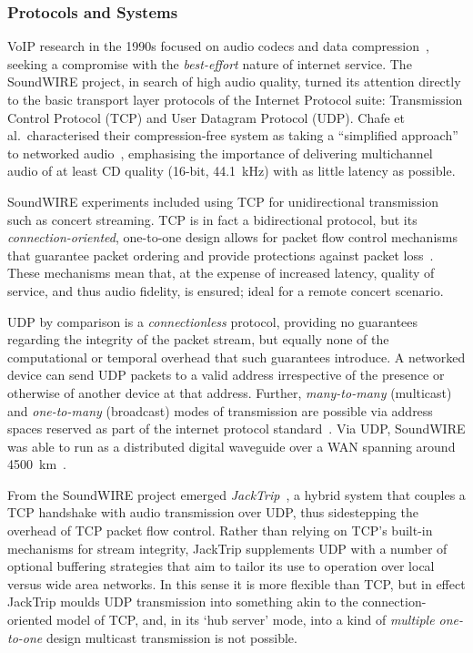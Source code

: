 \subsubsection{Protocols and Systems}\label{subsubsec:protocols-systems}

VoIP research in the 1990s focused on audio codecs and data
compression~\citep{turletti_inria_1995,hardman_successful_1998}, seeking a
compromise with the \textit{best-effort} nature of internet service.
The SoundWIRE project, in search of high audio quality, turned its attention
directly to the basic transport layer protocols of the Internet Protocol suite:
Transmission Control Protocol (TCP) and User Datagram Protocol (UDP).
Chafe et al.\ characterised their compression-free system as taking a
``simplified approach'' to networked audio~\citep{chafe_simplified_2000},
emphasising the importance of delivering multichannel audio of at least CD
quality (16-bit, \qty{44.1}{\kHz}) with as little latency as possible.

SoundWIRE experiments included using TCP for unidirectional transmission such as
concert streaming.
TCP is in fact a bidirectional protocol, but its \textit{connection-oriented},
one-to-one design allows for packet flow control mechanisms that guarantee
packet ordering and provide protections against packet
loss~\citep{schiavoni_alternatives_2013,al-dhief_performance_2018}.
These mechanisms mean that, at the expense of increased latency, quality of
service, and thus audio fidelity, is ensured; ideal for a remote concert
scenario.

UDP by comparison is a \textit{connectionless} protocol, providing no guarantees
regarding the integrity of the packet stream, but equally none of the
computational or temporal overhead that such guarantees introduce.
A networked device can send UDP packets to a valid address irrespective of the
presence or otherwise of another device at that address.
Further, \textit{many-to-many} (multicast) and \textit{one-to-many} (broadcast)
modes of transmission are possible via address spaces reserved as part of the
internet protocol standard~\citep{meyer_iana_2010}.
Via UDP, SoundWIRE was able to run as a distributed digital waveguide over a
WAN spanning around \qty{4500}{\km}~\citep{chafe_simplified_2000}.

From the SoundWIRE project emerged
\textit{JackTrip}~\citep{caceres_jacktrip_2010,caceres_jacktripsoundwire_2010},
a hybrid system that couples a TCP handshake with audio transmission over UDP,
thus sidestepping the overhead of TCP packet flow control.
Rather than relying on TCP's built-in mechanisms for stream integrity, JackTrip
supplements UDP with a number of optional buffering strategies that aim to
tailor its use to operation over local versus wide area networks.
In this sense it is more flexible than TCP, but in effect JackTrip moulds UDP
transmission into something akin to the connection-oriented model of TCP, and,
in its `hub server' mode, into a kind of \textit{multiple one-to-one} design
\textemdash{} multicast transmission is not possible.

